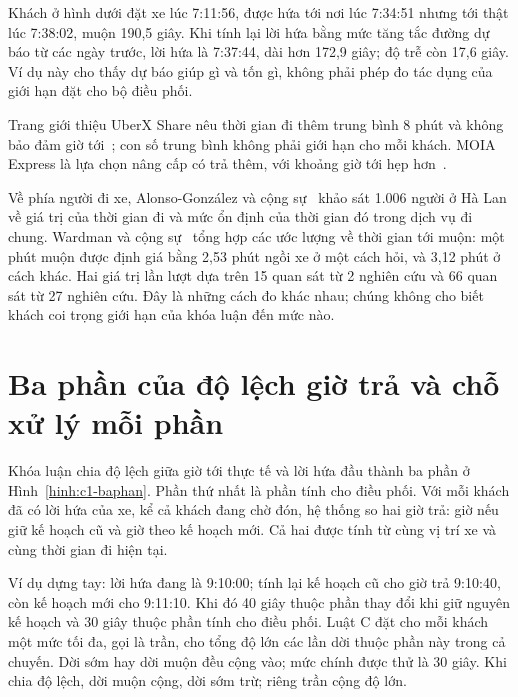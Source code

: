 Khách ở hình dưới đặt xe lúc 7:11:56, được hứa tới nơi lúc 7:34:51 nhưng tới thật lúc 7:38:02, muộn 190,5 giây.
Khi tính lại lời hứa bằng mức tăng tắc đường dự báo từ các ngày trước, lời hứa là 7:37:44, dài hơn 172,9 giây;
độ trễ còn 17,6 giây. Ví dụ này cho thấy dự báo giúp gì và tốn gì, không phải phép đo tác dụng của giới hạn
đặt cho bộ điều phối. 

Trang giới thiệu UberX Share nêu thời gian đi thêm trung bình 8 phút và không bảo đảm giờ
tới~\cite{uberxshare}; con số trung bình không phải giới hạn cho mỗi khách.
MOIA Express là lựa chọn nâng cấp có trả thêm, với khoảng giờ tới hẹp hơn~\cite{moiaexpress}.

Về phía người đi xe, Alonso-González và cộng sự~\cite{alonsogonzalez2020} khảo sát 1.006 người ở Hà Lan về giá
trị của thời gian đi và mức ổn định của thời gian đó trong dịch vụ đi chung. Wardman và cộng sự~\cite{wardman2026} tổng hợp các ước lượng về
thời gian tới muộn: một phút muộn được định giá bằng 2,53 phút ngồi xe ở một cách hỏi, và 3,12 phút ở cách khác.
Hai giá trị lần lượt dựa trên 15 quan sát từ 2 nghiên cứu và 66 quan sát từ 27 nghiên cứu. Đây là những cách
đo khác nhau; chúng không cho biết khách coi trọng giới hạn của khóa luận đến mức nào.

\section{Ba phần của độ lệch giờ trả và chỗ xử lý mỗi phần}
\label{muc:c1-cauhoi}

Khóa luận chia độ lệch giữa giờ tới thực tế và lời hứa đầu thành ba phần ở Hình~\ref{hinh:c1-baphan}.
Phần thứ nhất là phần tính cho điều phối. Với mỗi khách đã có lời hứa của xe, kể cả khách đang chờ đón, hệ
thống so hai giờ trả: giờ nếu giữ kế hoạch cũ và giờ theo kế hoạch mới. Cả hai được tính từ cùng vị trí xe
và cùng thời gian đi hiện tại.

Ví dụ dựng tay: lời hứa đang là 9:10:00; tính lại kế hoạch cũ cho giờ trả 9:10:40, còn kế hoạch mới cho
9:11:10. Khi đó 40 giây thuộc phần thay đổi khi giữ nguyên kế hoạch và 30 giây thuộc phần tính cho điều phối.
Luật C đặt cho mỗi khách một mức tối đa, gọi là trần, cho tổng độ lớn các lần dời thuộc phần này trong cả
chuyến. Dời sớm hay dời muộn đều cộng vào; mức chính được thử là 30 giây. Khi chia độ lệch, dời muộn cộng, dời sớm
trừ; riêng trần cộng độ lớn.

